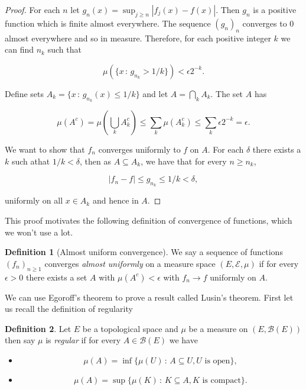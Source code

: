 \documentclass[
]{book}
\providecommand{\tightlist}{%
  \setlength{\itemsep}{0pt}\setlength{\parskip}{0pt}}
\theoremstyle{definition}
\newtheorem{definition}{Definition}[chapter]
\theoremstyle{definition}
\theoremstyle{definition}
\theoremstyle{definition}
\theoremstyle{remark}
\begin{document}
\begin{proof}
For each \(n\) let \(g_n(x) = \sup_{j \geq n}|f_j(x)-f(x)|\). Then \(g_n\) is a positive function which is finite almost everywhere. The sequence \((g_n)_n\) converges to 0 almost everywhere and so in measure. Therefore, for each positive integer \(k\) we can find \(n_k\) such that

\[ \mu \left( \{ x \,:\, g_{n_k} > 1/k \} \right) < \epsilon 2^{-k}.  \]

Define sets \(A_k = \{ x\,:\, g_{n_k}(x) \leq 1/k\}\) and let \(A= \bigcap_k A_k\). The set \(A\) has

\[ \mu(A^c) = \mu \left( \bigcup_k A_k^c \right) \leq \sum_k \mu(A_k^c) \leq \sum_k \epsilon 2^{-k} = \epsilon. \]

We want to show that \(f_n\) converges uniformly to \(f\) on \(A\). For each \(\delta\) there exists a \(k\) such athat \(1/k < \delta\), then as \(A \subseteq A_k\), we have that for every \(n \geq n_k\),

\[ |f_n - f| \leq g_{n_k} \leq 1/k < \delta, \]

uniformly on all \(x \in A_k\) and hence in \(A\).
\end{proof}

This proof motivates the following definition of convergence of functions, which we won't use a lot.

\begin{definition}[Almost uniform convergence]
We say a sequence of functions \((f_n)_{n \geq 1}\) converges \emph{almost uniformly} on a measure space \((E, \mathcal{E}, \mu)\) if for every \(\epsilon >0\) there exists a set \(A\) with \(\mu(A^c)< \epsilon\) with \(f_n \rightarrow f\) uniformly on \(A\).
\end{definition}

We can use Egoroff's theorem to prove a result called Lusin's theorem. First let us recall the definition of regularity

\begin{definition}

Let \(E\) be a topological space and \(\mu\) be a measure on \((E, \mathcal{B}(E))\) then say \(\mu\) is \emph{regular} if for every \(A \in \mathcal{B}(E)\) we have

\begin{itemize}
\tightlist
\item
  \[\mu(A) = \inf \{ \mu(U) \,:\, A \subseteq U, \mbox{$U$ is open}\},\]
\item
  \[\mu(A) = \sup \{ \mu(K) \,:\, K \subseteq A, \mbox{$K$ is compact}\}.\]
\end{itemize}

\end{definition}
\end{document}
